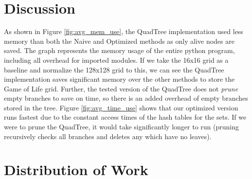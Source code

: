 \documentclass[11pt]{article}
\begin{document}
\section{Discussion}
As shown in Figure \ref{fig:avg_mem_use}, the QuadTree implementation used less memory than both the Naive and Optimized methods as only alive nodes are saved.  The graph represents the memory usage of the entire python program, including all overhead for imported modules.  If we take the 16x16 grid as a baseline and normalize the 128x128 grid to this, we can see the QuadTree implementation saves significant memory over the other methods to store the Game of Life grid.  Further, the tested version of the QuadTree does not \textit{prune} empty branches to save on time, so there is an added overhead of empty branches stored in the tree.  Figure \ref{fig:avg_time_use} shows that our optimized version runs fastest due to the constant access times of the hash tables for the sets.  If we were to prune the QuadTree, it would take significantly longer to run (pruning recursively checks all branches and deletes any which have no leaves).
\section{Distribution of Work}
\end{document}
